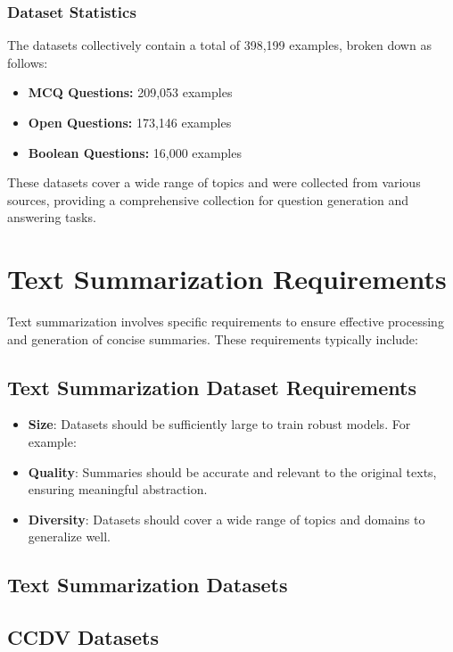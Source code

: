 \subsubsection{Dataset Statistics}

The datasets collectively contain a total of 398,199 examples, broken down as follows:
\begin{itemize}
    \item \textbf{MCQ Questions:} 209,053 examples
    \item \textbf{Open Questions:} 173,146 examples
    \item \textbf{Boolean Questions:} 16,000 examples
\end{itemize}

These datasets cover a wide range of topics and were collected from various sources, providing a comprehensive collection for question generation and answering tasks.

\newpage

\section{Text Summarization Requirements}

Text summarization involves specific requirements to ensure effective processing and generation of concise summaries. These requirements typically include:

\subsection{Text Summarization Dataset Requirements}

\begin{itemize}
    \item \textbf{Size}: Datasets should be sufficiently large to train robust models. For example:
    \item \textbf{Quality}: Summaries should be accurate and relevant to the original texts, ensuring meaningful abstraction.
    \item \textbf{Diversity}: Datasets should cover a wide range of topics and domains to generalize well.
\end{itemize}



\subsection*{Text Summarization Datasets}

\subsection*{CCDV Datasets}

